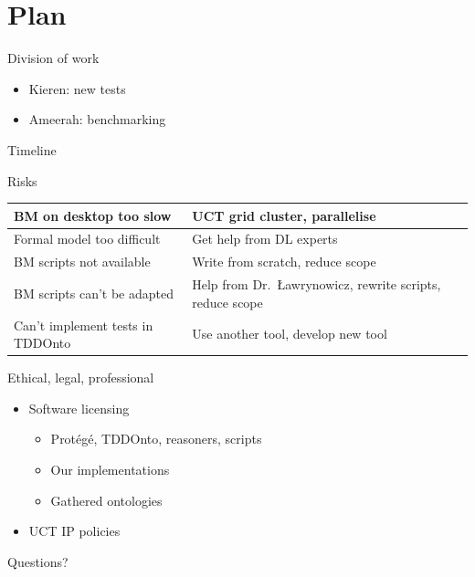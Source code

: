 \documentclass[17pt,mathserif]{beamer}
\begin{document}
\section{Plan}

\begin{frame}{Division of work}
  \begin{itemize}
    \item Kieren: new tests
    \item Ameerah: benchmarking
  \end{itemize}
\end{frame}

\begin{frame}{Timeline}
  \resizebox{\textwidth}{!}{}
\end{frame}

\begin{frame}{Risks}
  \footnotesize
  \renewcommand{\arraystretch}{2}
  \begin{tabular}{@{}>{\raggedright}p{}>{\raggedright\arraybackslash}p{}@{}}
    BM on desktop too slow &
    UCT grid cluster, parallelise \\ \hline
    Formal model too difficult &
    Get help from DL experts \\ \hline
    BM scripts not available &
    Write from scratch, reduce scope \\ \hline
    BM scripts can't be adapted &
    Help from Dr.\ {\L}awrynowicz, rewrite scripts, reduce scope \\ \hline
    Can't implement tests in {TDDOnto} &
    Use another tool, develop new tool
  \end{tabular}
\end{frame}

\begin{frame}{Ethical, legal, professional}
  \begin{itemize}
    \item Software licensing
    \begin{itemize}
      \item Prot\'eg\'e, TDDOnto, reasoners, scripts
      \item Our implementations
      \item Gathered ontologies
    \end{itemize}
    \item UCT IP policies
  \end{itemize}
\end{frame}

\begin{frame}
  \centering
  Questions?
\end{frame}
\end{document}
